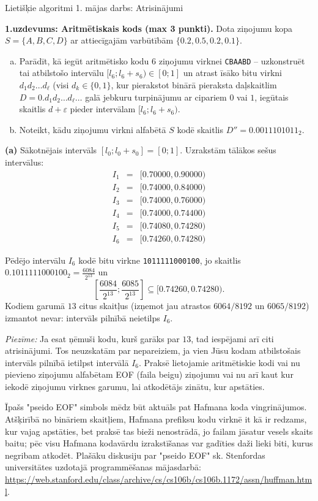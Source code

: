 \documentclass[11pt]{article}
\begin{document}
\thispagestyle{empty}

{\Large Lietišķie algoritmi \textendash{} 1. mājas darbs: Atrisinājumi}


{\footnotesize
\noindent
{\bf 1.uzdevums: Aritmētiskais kods (max 3 punkti).}
Dota ziņojumu kopa $S = \{ A,B,C,D \}$ ar attiecīgajām varbūtībām 
$\{ 0.2, 0.5, 0.2, 0.1 \}$.
\begin{enumerate}[(a)]
\item Parādīt, kā iegūt aritmētisko kodu $6$ ziņojumu virknei {\tt CBAABD} -- uzkonstruēt
tai atbilstošo intervālu $[l_6;l_6+s_6) \in [0;1]$ un atrast 
īsāko bitu virkni $d_1d_2\ldots{}d_{\ell}$ (visi $d_k \in \{ 0,1 \}$, 
kur pierakstot binārā pieraksta daļskaitlim $D = 0.d_1d_2\ldots{}d_{\ell}\ldots$ 
galā jebkuru turpinājumu ar cipariem $0$ vai $1$, iegūtais skaitlis $d+\varepsilon$ pieder
intervālam $[l_6;l_6+s_6)$.
\item Noteikt, kādu ziņojumu virkni alfabētā $S$ kodē skaitlis 
$D'' = 0.0011101011_2$.
\end{enumerate}
}

\noindent
{\bf (a)} Sākotnējais intervāls $[l_0;l_0+s_0] = [0;1]$. Uzrakstām tālākos 
sešus intervālus: 
$$\begin{array}{rcl}
I_1 & = & [0.70000,0.90000)\\
I_2 & = & [0.74000,0.84000)\\
I_3 & = & [0.74000,0.76000)\\
I_4 & = & [0.74000,0.74400)\\
I_5 & = & [0.74080,0.74280)\\
I_6 & = & [0.74260,0.74280)
\end{array}$$

Pēdējo intervālu $I_6$ kodē bitu virkne {\tt 1011111000100}, jo 
skaitlis ${\displaystyle 0.1011111000100_2 = \frac{6084}{2^{13}}}$
un 
$$\left[ \frac{6084}{2^{13}}; \frac{6085}{2^{13}} \right] \subseteq [0.74260,0.74280).$$
Kodiem garumā $13$ citus skaitļus (izņemot jau atrastos $6064/8192$ un $6065/8192$) izmantot nevar: 
intervāls pilnībā neietilps $I_6$.

{\em Piezīme:} Ja esat ņēmuši kodu, kurš garāks par $13$, tad
iespējami arī citi atrisinājumi. Tos neuzskatām par nepareiziem, ja vien 
Jūsu kodam atbilstošais intervāls pilnībā ietilpst intervālā $I_6$. 
Praksē lietojamie aritmētiskie kodi vai nu pievieno ziņojumu 
alfabētam EOF (faila beigu) ziņojumu vai nu arī kaut kur 
iekodē ziņojumu virknes garumu, lai 
atkodētājs zinātu, kur apstāties. 

Īpašs "pseido EOF" simbols mēdz būt aktuāls pat Hafmana koda vingrinājumos. 
Atšķirībā no bināriem skaitļiem, Hafmana prefiksu kodu virknē it kā ir redzams, kur 
vajag apstāties, bet praksē tas bieži nenostrādā, jo failam jāsatur vesels skaits baitu; 
pēc visu Hafmana kodavārdu izrakstīšanas var gadīties daži lieki biti, kurus negribam atkodēt. 
Plašāku diskusiju par "pseido EOF" sk. Stenfordas universitātes uzdotajā programmēšanas mājasdarbā:\\
\url{https://web.stanford.edu/class/archive/cs/cs106b/cs106b.1172/assn/huffman.html}. 
\end{document}
